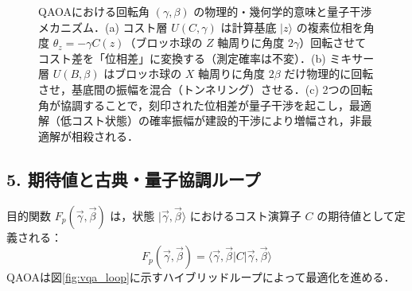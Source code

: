\documentclass[11pt,a4paper,oneside,openany]{ltjsbook}
\theoremstyle{definition}
\theoremstyle{plain}
\theoremstyle{remark}
\newcommand{\ket}[1]{|#1\rangle}
\newcommand{\mel}[3]{\langle#1|#2|#3\rangle}
\begin{document}
\begin{figure}[htbp]
\caption{QAOAにおける回転角 $(\gamma, \beta)$ の物理的・幾何学的意味と量子干渉メカニズム．(a) コスト層 $U(C, \gamma)$ は計算基底 $\ket{z}$ の複素位相を角度 $\theta_z = -\gamma C(z)$（ブロッホ球の $Z$ 軸周りに角度 $2\gamma$）回転させてコスト差を「位相差」に変換する（測定確率は不変）．(b) ミキサー層 $U(B, \beta)$ はブロッホ球の $X$ 軸周りに角度 $2\beta$ だけ物理的に回転させ，基底間の振幅を混合（トンネリング）させる．(c) 2つの回転角が協調することで，刻印された位相差が量子干渉を起こし，最適解（低コスト状態）の確率振幅が建設的干渉により増幅され，非最適解が相殺される．}
\label{fig:qaoa_rotation_angles}
\end{figure}

\subsection{5. 期待値と古典・量子協調ループ}
目的関数 $F_p(\vec{\gamma}, \vec{\beta})$ は，状態 $\ket{\vec{\gamma}, \vec{\beta}}$ におけるコスト演算子 $C$ の期待値として定義される：
\begin{equation}
    F_p(\vec{\gamma}, \vec{\beta}) = \mel{\vec{\gamma}, \vec{\beta}}{C}{\vec{\gamma}, \vec{\beta}}
\end{equation}
QAOAは図\ref{fig:vqa_loop}に示すハイブリッドループによって最適化を進める．
\end{document}
